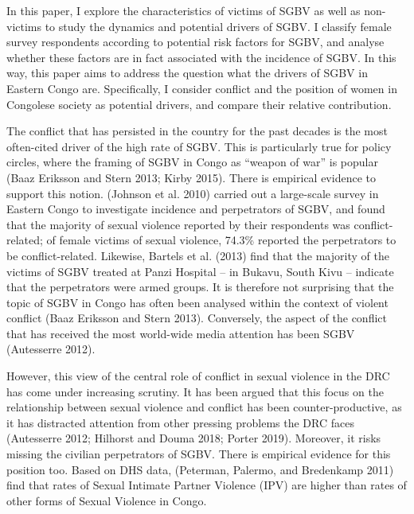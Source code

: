 \documentclass[
]{article}
\begin{document}
In this paper, I explore the characteristics of victims of SGBV as well
as non-victims to study the dynamics and potential drivers of SGBV. I
classify female survey respondents according to potential risk factors
for SGBV, and analyse whether these factors are in fact associated with
the incidence of SGBV. In this way, this paper aims to address the
question what the drivers of SGBV in Eastern Congo are. Specifically, I
consider conflict and the position of women in Congolese society as
potential drivers, and compare their relative contribution.

The conflict that has persisted in the country for the past decades is
the most often-cited driver of the high rate of SGBV. This is
particularly true for policy circles, where the framing of SGBV in Congo
as ``weapon of war'' is popular (Baaz Eriksson and Stern 2013; Kirby
2015). There is empirical evidence to support this notion. (Johnson et
al. 2010) carried out a large-scale survey in Eastern Congo to
investigate incidence and perpetrators of SGBV, and found that the
majority of sexual violence reported by their respondents was
conflict-related; of female victims of sexual violence, 74.3\% reported
the perpetrators to be conflict-related. Likewise, Bartels et al. (2013)
find that the majority of the victims of SGBV treated at Panzi Hospital
-- in Bukavu, South Kivu -- indicate that the perpetrators were armed
groups. It is therefore not surprising that the topic of SGBV in Congo
has often been analysed within the context of violent conflict (Baaz
Eriksson and Stern 2013). Conversely, the aspect of the conflict that
has received the most world-wide media attention has been SGBV
(Autesserre 2012).

However, this view of the central role of conflict in sexual violence in
the DRC has come under increasing scrutiny. It has been argued that this
focus on the relationship between sexual violence and conflict has been
counter-productive, as it has distracted attention from other pressing
problems the DRC faces (Autesserre 2012; Hilhorst and Douma 2018; Porter
2019). Moreover, it risks missing the civilian perpetrators of SGBV.
There is empirical evidence for this position too. Based on DHS data,
(Peterman, Palermo, and Bredenkamp 2011) find that rates of Sexual
Intimate Partner Violence (IPV) are higher than rates of other forms of
Sexual Violence in Congo.
\end{document}
